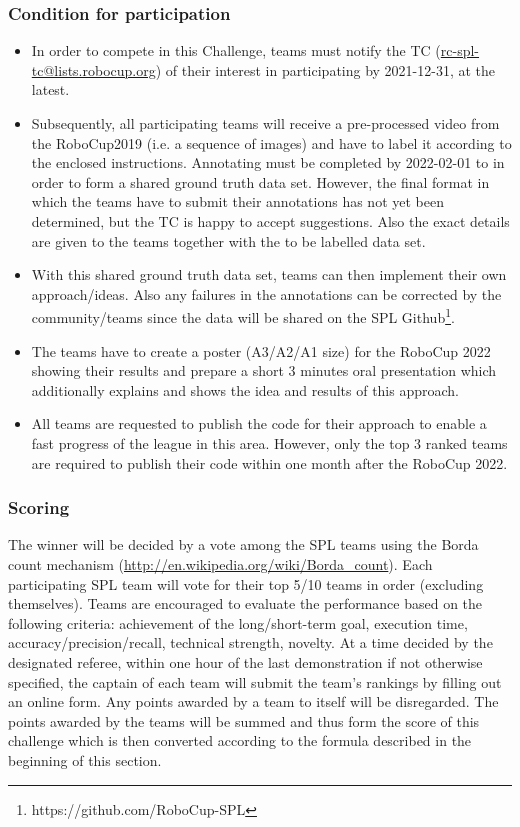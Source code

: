     \subsubsection{Condition for participation}
    \begin{itemize}
    \item In order to compete in this Challenge, teams must notify the TC (\url{rc-spl-tc@lists.robocup.org}) of their interest in participating by 2021-12-31, at the latest.
    \item Subsequently, all participating teams will receive a pre-processed video from the RoboCup2019 (i.e. a sequence of images) and have to label it according to the enclosed instructions. Annotating must be completed by 2022-02-01 to in order to form a shared ground truth data set. However, the final format in which the teams have to submit their annotations has not yet been determined, but the TC is happy to accept suggestions. Also the exact details are given to the teams together with the to be labelled data set.
    \item With this shared ground truth data set, teams can then implement their own approach/ideas. Also any failures in the annotations can be corrected by the community/teams since the data will be shared on the SPL Github\footnote{https://github.com/RoboCup-SPL}.
    \item The teams have to create a poster (A3/A2/A1 size) for the RoboCup 2022 showing their results and prepare a short 3 minutes oral presentation which additionally explains and shows the idea and results of this approach.
    \item All teams are requested to publish the code for their approach to enable a fast progress of the league in this area. However, only the top 3 ranked teams are required to publish their code within one month after the RoboCup 2022. 
    \end{itemize}

    \subsubsection{Scoring}
    The winner will be decided by a vote among the SPL teams using the Borda count mechanism (\url{http://en.wikipedia.org/wiki/Borda_count}). Each participating SPL team will vote for their top 5/10 teams in order (excluding themselves). Teams are encouraged to evaluate the performance based on the following criteria: achievement of the long/short-term goal, execution time, accuracy/precision/recall, technical strength, novelty. At a time decided by the designated referee, within one hour of the last demonstration if not otherwise specified, the captain of each team will submit the team's rankings by filling out an online form. Any points awarded by a team to itself will be disregarded. The points awarded by the teams will be summed and thus form the score of this challenge which is then converted according to the formula described in the beginning of this section.

